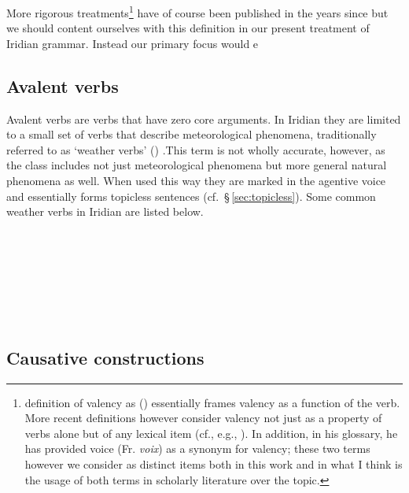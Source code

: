 More rigorous treatments\footnote{ definition of valency
as 
()
essentially frames valency as a function of the verb. More recent definitions
however consider valency not just as a property of verbs alone but of any
lexical item (cf., e.g., \cite{matthews1997,trask1993}). In addition, in his
glossary, he has provided voice (Fr. \emph{voix}) as a synonym for valency;
these two terms however we consider as distinct items both in this work and in
what I think is the usage of both terms in scholarly literature over the topic.}
have of course been published in the years since but we should content ourselves
with this definition in our present treatment of Iridian grammar. Instead our
primary focus would e

\subsection{Avalent verbs}

Avalent verbs  are verbs that have zero core arguments. In
Iridian they are limited to a small set of verbs that describe meteorological
phenomena, traditionally referred to as `weather verbs' ()
.This term is not wholly accurate, however, as the class
includes not just meteorological phenomena but more general natural phenomena as
well. When used this way they are marked in the agentive voice and essentially forms topicless sentences
(cf.~\S\,\ref{sec:topicless}). Some common weather verbs in Iridian are listed
below.

\pex{}
\\
\\
\\
\\
\\
\\
\xe

\subsection{Causative constructions}

